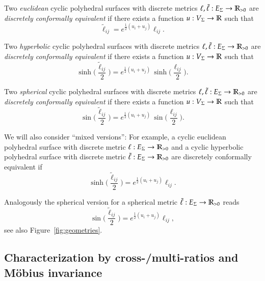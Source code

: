 \documentclass[Thesis]{subfiles}
\begin{document}
Two \emph{euclidean} cyclic polyhedral surfaces with discrete metrics $\ell,\tilde\ell:E_{\Sigma}\rightarrow\mathbb R_{>0}$ are \emph{discretely conformally equivalent} if there exists a function $u:V_{\Sigma}\rightarrow\mathbb R$ such that
\begin{equation}
\label{eq:tilde_ell_euc}
\tilde\ell_\mathit{ij}=e^{\frac{1}{2}(u_{i}+u_{j})}\ell_\mathit{ij}.
\end{equation}

Two \emph{hyperbolic} cyclic polyhedral surfaces with discrete metrics $\ell,\tilde\ell:E_{\Sigma}\rightarrow\mathbb R_{>0}$ are \emph{discretely conformally equivalent} if there exists a function $u:V_{\Sigma}\rightarrow\mathbb R$ such that
\begin{equation}
\label{eq:tilde_ell_hyp}
\sinh\Big(\frac{\tilde\ell_\mathit{ij}}{2}\Big)
= e^{\frac{1}{2}(u_{i}+u_{j})}\,
\sinh\Big(\frac{\ell_\mathit{ij}}{2}\Big).
\end{equation}


Two \emph{spherical} cyclic polyhedral surfaces with discrete metrics $\ell,\tilde\ell:E_{\Sigma}\rightarrow\mathbb R_{>0}$ are \emph{discretely conformally equivalent} if there exists a function $u:V_{\Sigma}\rightarrow\mathbb R$ such that
\begin{equation}
\label{eq:tilde_ell_sph}
\sin\Big(\frac{\tilde\ell_\mathit{ij}}{2}\Big)
= e^{\frac{1}{2}(u_{i}+u_{j})}\,
\sin\Big(\frac{\ell_\mathit{ij}}{2}\Big).
\end{equation}

We will also consider ``mixed versions'': For example, a cyclic euclidean polyhedral surface with discrete metric $\ell:E_{\Sigma}\rightarrow\mathbb R_{>0}$ and a cyclic hyperbolic polyhedral surface with discrete metric $\tilde\ell:E_{\Sigma}\rightarrow\mathbb R_{>0}$ are discretely conformally equivalent if
\begin{equation*}
\sinh\Big(\frac{\tilde\ell_\mathit{ij}}{2}\Big)
= e^{\frac{1}{2}(u_{i}+u_{j})}\ell_\mathit{ij}.
\end{equation*}

Analogously the spherical version for a spherical metric $\tilde\ell:E_{\Sigma}\rightarrow\mathbb R_{>0}$ reads
\begin{equation*}
\sin\Big(\frac{\tilde\ell_\mathit{ij}}{2}\Big)
= e^{\frac{1}{2}(u_{i}+u_{j})}\ell_\mathit{ij},
\end{equation*}
see also Figure~\ref{fig:geometries}. 

\subsection{Characterization by cross-/multi-ratios and M{\"o}bius invariance}
\label{sec:cross-ratios}
\end{document}

